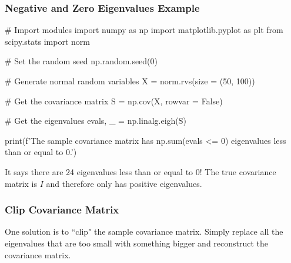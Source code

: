 \documentclass{beamer}
\begin{document}
\begin{frame}[fragile]
\frametitle{Negative and Zero Eigenvalues Example}
{
\linespread{0.8}
\tiny
\begin{verbatim*}
# Import modules
import numpy as np
import matplotlib.pyplot as plt
from scipy.stats import norm

# Set the random seed
np.random.seed(0)

# Generate normal random variables
X = norm.rvs(size = (50, 100))

# Get the covariance matrix
S = np.cov(X, rowvar = False)

# Get the eigenvalues
evals, _ =  np.linalg.eigh(S)

print(f'The sample covariance matrix has {np.sum(evals <= 0)} eigenvalues less than or equal to 0.')
\end{verbatim*}
}

It says there are 24 eigenvalues less than or equal to 0! The true covariance matrix  is $I$ and therefore only has positive eigenvalues. 
\end{frame}

\begin{frame}
\frametitle{Clip Covariance Matrix}

One solution is to ``clip" the sample covariance matrix. Simply replace all the eigenvalues that are too small with something bigger and reconstruct the covariance matrix.

\end{frame}
\end{document}
